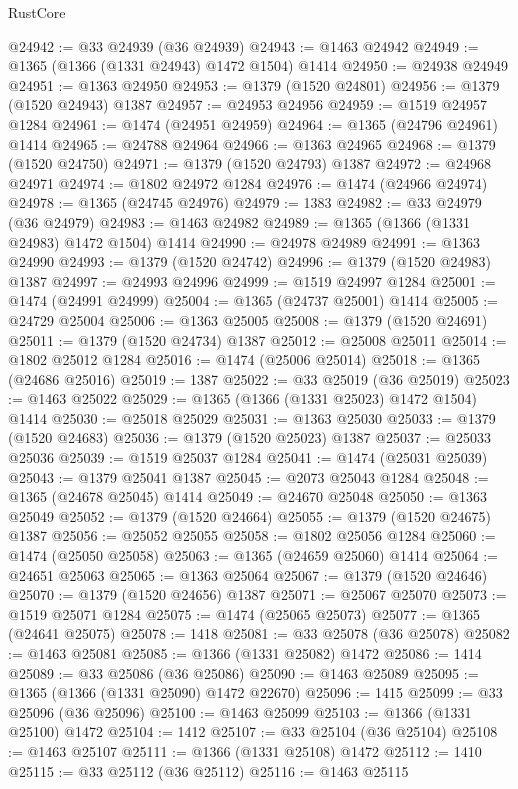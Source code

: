 \begin{lexlean}{RustCore}
\begin{coremodule}
@24942 := @33 @24939 (@36 @24939)
@24943 := @1463 @24942
@24949 := @1365 (@1366 (@1331 @24943) @1472 @1504) @1414
@24950 := @24938 @24949
@24951 := @1363 @24950
@24953 := @1379 (@1520 @24801)
@24956 := @1379 (@1520 @24943) @1387
@24957 := @24953 @24956
@24959 := @1519 @24957 @1284
@24961 := @1474 (@24951 @24959)
@24964 := @1365 (@24796 @24961) @1414
@24965 := @24788 @24964
@24966 := @1363 @24965
@24968 := @1379 (@1520 @24750)
@24971 := @1379 (@1520 @24793) @1387
@24972 := @24968 @24971
@24974 := @1802 @24972 @1284
@24976 := @1474 (@24966 @24974)
@24978 := @1365 (@24745 @24976)
@24979 := 1383
@24982 := @33 @24979 (@36 @24979)
@24983 := @1463 @24982
@24989 := @1365 (@1366 (@1331 @24983) @1472 @1504) @1414
@24990 := @24978 @24989
@24991 := @1363 @24990
@24993 := @1379 (@1520 @24742)
@24996 := @1379 (@1520 @24983) @1387
@24997 := @24993 @24996
@24999 := @1519 @24997 @1284
@25001 := @1474 (@24991 @24999)
@25004 := @1365 (@24737 @25001) @1414
@25005 := @24729 @25004
@25006 := @1363 @25005
@25008 := @1379 (@1520 @24691)
@25011 := @1379 (@1520 @24734) @1387
@25012 := @25008 @25011
@25014 := @1802 @25012 @1284
@25016 := @1474 (@25006 @25014)
@25018 := @1365 (@24686 @25016)
@25019 := 1387
@25022 := @33 @25019 (@36 @25019)
@25023 := @1463 @25022
@25029 := @1365 (@1366 (@1331 @25023) @1472 @1504) @1414
@25030 := @25018 @25029
@25031 := @1363 @25030
@25033 := @1379 (@1520 @24683)
@25036 := @1379 (@1520 @25023) @1387
@25037 := @25033 @25036
@25039 := @1519 @25037 @1284
@25041 := @1474 (@25031 @25039)
@25043 := @1379 @25041 @1387
@25045 := @2073 @25043 @1284
@25048 := @1365 (@24678 @25045) @1414
@25049 := @24670 @25048
@25050 := @1363 @25049
@25052 := @1379 (@1520 @24664)
@25055 := @1379 (@1520 @24675) @1387
@25056 := @25052 @25055
@25058 := @1802 @25056 @1284
@25060 := @1474 (@25050 @25058)
@25063 := @1365 (@24659 @25060) @1414
@25064 := @24651 @25063
@25065 := @1363 @25064
@25067 := @1379 (@1520 @24646)
@25070 := @1379 (@1520 @24656) @1387
@25071 := @25067 @25070
@25073 := @1519 @25071 @1284
@25075 := @1474 (@25065 @25073)
@25077 := @1365 (@24641 @25075)
@25078 := 1418
@25081 := @33 @25078 (@36 @25078)
@25082 := @1463 @25081
@25085 := @1366 (@1331 @25082) @1472
@25086 := 1414
@25089 := @33 @25086 (@36 @25086)
@25090 := @1463 @25089
@25095 := @1365 (@1366 (@1331 @25090) @1472 @22670)
@25096 := 1415
@25099 := @33 @25096 (@36 @25096)
@25100 := @1463 @25099
@25103 := @1366 (@1331 @25100) @1472
@25104 := 1412
@25107 := @33 @25104 (@36 @25104)
@25108 := @1463 @25107
@25111 := @1366 (@1331 @25108) @1472
@25112 := 1410
@25115 := @33 @25112 (@36 @25112)
@25116 := @1463 @25115

\end{coremodule}
\end{lexlean}
